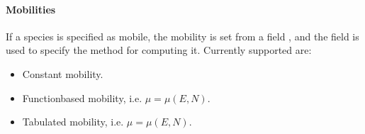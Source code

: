 \documentclass[letterpaper,10pt,english]{sphinxmanual}
\begin{document}
\begin{sphinxVerbatim}[commandchars=\\\{\},formatcom=\scriptsize]
                
                
                \PYG{p}{[}\PYG{p}{]}
           \PYG{p}{]}
          
            
            
            
            
            
            
            
            
  \PYG{p}{]}
\end{sphinxVerbatim}


\paragraph{Mobilities}
\label{\detokenize{Applications/CdrPlasmaModel:mobilities}}\label{\detokenize{Applications/CdrPlasmaModel:chap-cdrplasmajsonmobility}}
\sphinxAtStartPar
If a species is specified as mobile, the mobility is set from a field , and the field  is used to specify the method for computing it.
Currently supported are:
\begin{itemize}
\item {} 
\sphinxAtStartPar
Constant mobility.

\item {} 
\sphinxAtStartPar
Function\sphinxhyphen{}based mobility, i.e. \(\mu = \mu(E,N)\).

\item {} 
\sphinxAtStartPar
Tabulated mobility, i.e. \(\mu = \mu(E,N)\).

\end{itemize}
\end{document}
